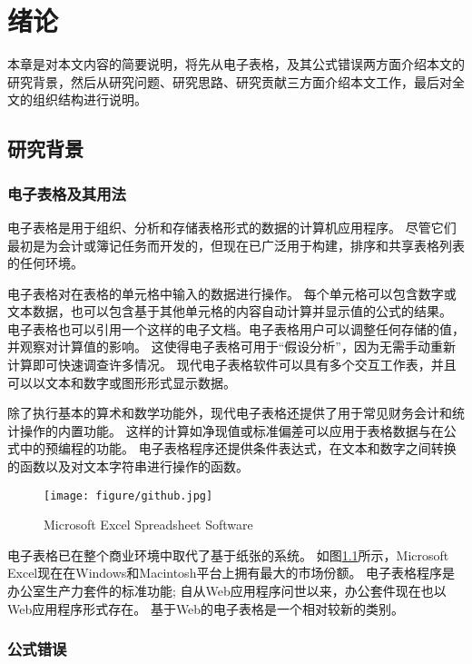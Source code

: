 \chapter{绪论}\label{introduction}

本章是对本文内容的简要说明，将先从电子表格，及其公式错误两方面介绍本文的研究背景，然后从研究问题、研究思路、研究贡献三方面介绍本文工作，最后对全文的组织结构进行说明。

\section{研究背景}

\subsection{电子表格及其用法}
电子表格\cite{BHR12}是用于组织、分析和存储表格形式的数据的计算机应用程序。
尽管它们最初是为会计或簿记任务而开发的，但现在已广泛用于构建，排序和共享表格列表的任何环境。

电子表格对在表格的单元格中输入的数据进行操作。
每个单元格可以包含数字或文本数据，也可以包含基于其他单元格的内容自动计算并显示值的公式的结果。
电子表格也可以引用一个这样的电子文档。电子表格用户可以调整任何存储的值，并观察对计算值的影响。
这使得电子表格可用于“假设分析”，因为无需手动重新计算即可快速调查许多情况。
现代电子表格软件可以具有多个交互工作表，并且可以以文本和数字或图形形式显示数据。

除了执行基本的算术和数学功能外，现代电子表格还提供了用于常见财务会计和统计操作的内置功能。
这样的计算如净现值或标准偏差可以应用于表格数据与在公式中的预编程的功能。
电子表格程序还提供条件表达式，在文本和数字之间转换的函数以及对文本字符串进行操作的函数。

\begin{figure}[t!]
    \centering
    \texttt{[image: figure/github.jpg]}
    \caption{Microsoft Excel Spreadsheet Software}   
    \label{fig:1} 
\end{figure}

电子表格已在整个商业环境中取代了基于纸张的系统。
如图\ref{fig:1}所示，Microsoft Excel现在在Windows和Macintosh平台上拥有最大的市场份额。
电子表格程序是办公室生产力套件的标准功能; 自从Web应用程序问世以来，办公套件现在也以Web应用程序形式存在。
基于Web的电子表格是一个相对较新的类别。



\subsection{公式错误}


